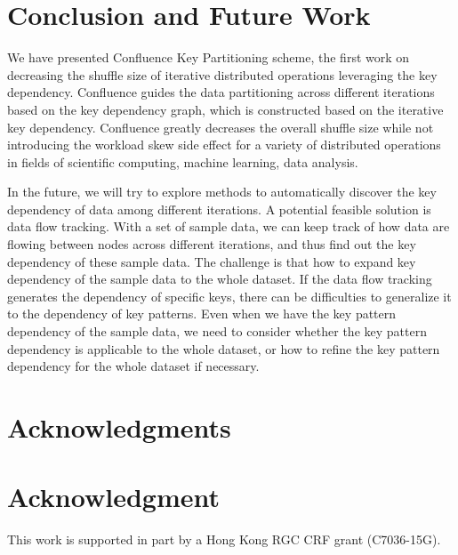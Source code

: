 \documentclass[10pt,journal,compsoc]{IEEEtran}
\begin{document}
\section{Conclusion and Future Work}\label{section:conclusion}
We have presented Confluence Key Partitioning scheme, the first work on decreasing the shuffle size of
iterative distributed operations leveraging the key dependency. 
Confluence guides the data partitioning across different iterations based on the key dependency graph, 
which is constructed based on the iterative key dependency.
Confluence greatly decreases the overall shuffle size while not introducing the workload skew side effect for a variety of distributed operations
in fields of scientific computing, machine learning, data
analysis.

In the future, we will try to explore methods to automatically discover the key dependency of data among different iterations. 
A potential feasible solution is data flow tracking. 
With a set of sample data, we can keep track of how data are flowing between nodes across different iterations, and thus find out the key dependency of these sample data. 
The challenge is that how to expand key dependency of the sample data to the whole dataset. 
If the data flow tracking generates the dependency of specific keys, 
there can be difficulties to generalize it to the dependency of key patterns.  
Even when we have the key pattern dependency of the sample data, 
we need to consider whether the key pattern dependency is applicable to the whole dataset, or how to refine the key pattern dependency for the whole dataset if necessary. 


\ifCLASSOPTIONcompsoc
 \section*{Acknowledgments}
\else
 \section*{Acknowledgment}
\fi
This work is supported in part by a Hong Kong RGC CRF grant
(C7036-15G).
\end{document}
